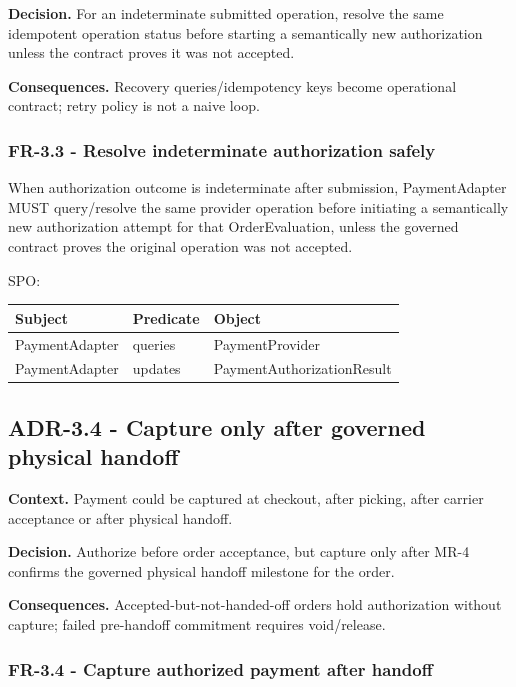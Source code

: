 \documentclass[
  10pt,
]{article}
\begin{document}
\textbf{Decision.} For an indeterminate submitted operation, resolve the
same idempotent operation status before starting a semantically new
authorization unless the contract proves it was not accepted.

\textbf{Consequences.} Recovery queries/idempotency keys become
operational contract; retry policy is not a naive loop.

\subsubsection{FR-3.3 - Resolve indeterminate authorization
safely}\label{fr-33---resolve-indeterminate-authorization-safely}

When authorization outcome is indeterminate after submission,
PaymentAdapter MUST query/resolve the same provider operation before
initiating a semantically new authorization attempt for that
OrderEvaluation, unless the governed contract proves the original
operation was not accepted.

SPO:

\begin{longtable}[]{@{}lll@{}}
\toprule\noalign{}
Subject & Predicate & Object \\
\midrule\noalign{}
\endhead
\bottomrule\noalign{}
\endlastfoot
PaymentAdapter & queries & PaymentProvider \\
PaymentAdapter & updates & PaymentAuthorizationResult \\
\end{longtable}

\subsection{ADR-3.4 - Capture only after governed physical
handoff}\label{adr-34---capture-only-after-governed-physical-handoff}

\textbf{Context.} Payment could be captured at checkout, after picking,
after carrier acceptance or after physical handoff.

\textbf{Decision.} Authorize before order acceptance, but capture only
after MR-4 confirms the governed physical handoff milestone for the
order.

\textbf{Consequences.} Accepted-but-not-handed-off orders hold
authorization without capture; failed pre-handoff commitment requires
void/release.

\subsubsection{FR-3.4 - Capture authorized payment after
handoff}\label{fr-34---capture-authorized-payment-after-handoff}
\end{document}
